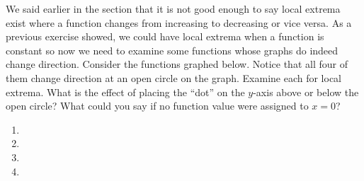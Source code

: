 {We said earlier in the section that it is not good enough to say local extrema exist where a function changes from increasing to decreasing or vice versa.  As a previous exercise showed, we could have local extrema when a function is constant so now we need to examine some functions whose graphs do indeed change direction.  Consider the functions graphed below.  Notice that all four of them change direction at an open circle on the graph. Examine each for local extrema.  What is the effect of placing the ``dot'' on the $y$-axis above or below the open circle?  What could you say if no function value were assigned to $x = 0$?

\begin{enumerate}

\item {}

\item {}

\item {}

\item {}
\end{enumerate}
 }
{}